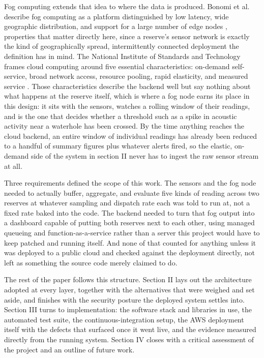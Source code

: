 \documentclass[conference,a4paper]{IEEEtran}
\begin{document}
Fog computing extends that idea to where the data is produced. Bonomi et al. describe fog computing as a platform distinguished by low latency, wide geographic distribution, and support for a large number of edge nodes \cite{ref1}, properties that matter directly here, since a reserve's sensor network is exactly the kind of geographically spread, intermittently connected deployment the definition has in mind. The National Institute of Standards and Technology frames cloud computing around five essential characteristics: on-demand self-service, broad network access, resource pooling, rapid elasticity, and measured service \cite{ref2}. Those characteristics describe the backend well but say nothing about what happens at the reserve itself, which is where a fog node earns its place in this design: it sits with the sensors, watches a rolling window of their readings, and is the one that decides whether a threshold such as a spike in acoustic activity near a waterhole has been crossed. By the time anything reaches the cloud backend, an entire window of individual readings has already been reduced to a handful of summary figures plus whatever alerts fired, so the elastic, on-demand side of the system in section II never has to ingest the raw sensor stream at all.

Three requirements defined the scope of this work. The sensors and the fog node needed to actually buffer, aggregate, and evaluate five kinds of reading across two reserves at whatever sampling and dispatch rate each was told to run at, not a fixed rate baked into the code. The backend needed to turn that fog output into a dashboard capable of putting both reserves next to each other, using managed queueing and function-as-a-service rather than a server this project would have to keep patched and running itself. And none of that counted for anything unless it was deployed to a public cloud and checked against the deployment directly, not left as something the source code merely claimed to do.

The rest of the paper follows this structure. Section II lays out the architecture adopted at every layer, together with the alternatives that were weighed and set aside, and finishes with the security posture the deployed system settles into. Section III turns to implementation: the software stack and libraries in use, the automated test suite, the continuous-integration setup, the AWS deployment itself with the defects that surfaced once it went live, and the evidence measured directly from the running system. Section IV closes with a critical assessment of the project and an outline of future work.
\end{document}
